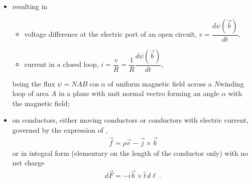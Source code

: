 \documentclass[letterpaper,10pt,english]{jupyterBook}
\begin{document}
\begin{itemize}
\item {} 
\sphinxAtStartPar
{} resulting in
\begin{itemize}
\item {} 
\sphinxAtStartPar
voltage difference at the electric port of an open circuit, \(v = \dfrac{d \psi(\vec{b})}{d t}\),

\item {} 
\sphinxAtStartPar
current in a closed loop, \(i = \dfrac{v}{R} = \dfrac{1}{R} \dfrac{d \psi(\vec{b})}{d t}\),

\end{itemize}

\sphinxAtStartPar
being the flux \(\psi = N A B \cos \alpha\) of uniform magnetic field across a \(N\)\sphinxhyphen{}winding loop of area \(A\) in a plane with unit normal vectro forming an angle \(\alpha\) with the magnetic field;

\item {} 
\sphinxAtStartPar
{} on conductors, either moving conductors or conductors with electric current, governed by the expression of ,
\begin{equation*}
\begin{split}\vec{f} = \rho \vec{e} - \vec{j} \times \vec{b}\end{split}
\end{equation*}
\sphinxAtStartPar
or in integral form (elementary on the length of the conductor only) with no net charge
\begin{equation*}
\begin{split}d \vec{F} = - i \vec{b} \times \hat{t} \, d \ell \ .\end{split}
\end{equation*}
\end{itemize}
\end{document}
